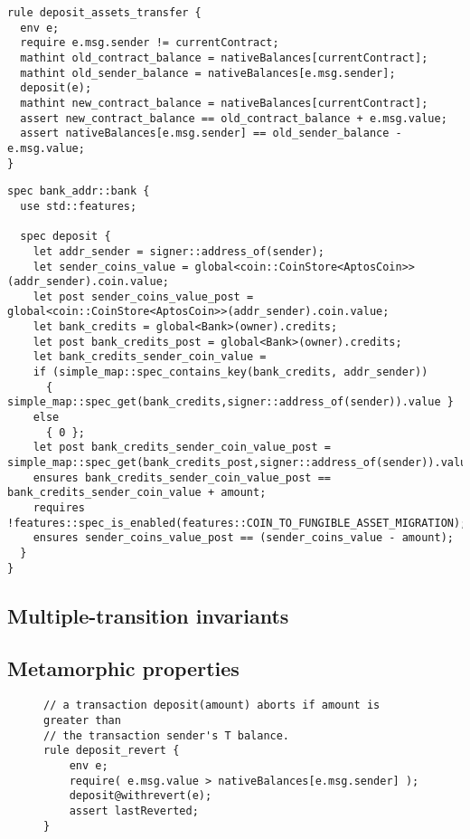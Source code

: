 \begin{lstlisting}[language=cvl,caption={Specification of \specurl{bank}{deposit-assets-transfer} in CVL}]
rule deposit_assets_transfer {
  env e;
  require e.msg.sender != currentContract;
  mathint old_contract_balance = nativeBalances[currentContract];
  mathint old_sender_balance = nativeBalances[e.msg.sender];
  deposit(e);
  mathint new_contract_balance = nativeBalances[currentContract];
  assert new_contract_balance == old_contract_balance + e.msg.value;
  assert nativeBalances[e.msg.sender] == old_sender_balance - e.msg.value;
}
\end{lstlisting}

\begin{lstlisting}[language=move,caption={Specification of \specurl{bank}{deposit-assets-transfer} in MSL}]
spec bank_addr::bank {
  use std::features;

  spec deposit {
    let addr_sender = signer::address_of(sender);
    let sender_coins_value = global<coin::CoinStore<AptosCoin>>(addr_sender).coin.value;
    let post sender_coins_value_post = global<coin::CoinStore<AptosCoin>>(addr_sender).coin.value;
    let bank_credits = global<Bank>(owner).credits;
    let post bank_credits_post = global<Bank>(owner).credits;
    let bank_credits_sender_coin_value =
    if (simple_map::spec_contains_key(bank_credits, addr_sender))
      { simple_map::spec_get(bank_credits,signer::address_of(sender)).value }
    else
      { 0 };
    let post bank_credits_sender_coin_value_post =  simple_map::spec_get(bank_credits_post,signer::address_of(sender)).value;
    ensures bank_credits_sender_coin_value_post == bank_credits_sender_coin_value + amount;
    requires !features::spec_is_enabled(features::COIN_TO_FUNGIBLE_ASSET_MIGRATION);
    ensures sender_coins_value_post == (sender_coins_value - amount);
  }
}
\end{lstlisting}


\subsection{Multiple-transition invariants}

\subsection{Metamorphic properties}

\begin{figure}[t]
\small
\begin{lstlisting}[language=cvl,caption={Simplified CVL code for the Bank verification},label={fig:specSol}]
// a transaction deposit(amount) aborts if amount is greater than 
// the transaction sender's T balance.  
rule deposit_revert {
    env e;
    require( e.msg.value > nativeBalances[e.msg.sender] );
    deposit@withrevert(e);
    assert lastReverted;
}
\end{lstlisting}
\end{figure}

